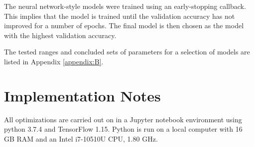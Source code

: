 The neural network-style models were trained using an early-stopping callback. This implies that the model is trained until the validation accuracy has not improved for a number of epochs. The final model is then chosen as the model with the highest validation accuracy. 

The tested ranges and concluded sets of parameters for a selection of models are listed in Appendix \ref{appendix:B}.

\section{Implementation Notes}

All optimizations are carried out on in a Jupyter notebook environment using python 3.7.4 and TensorFlow 1.15. Python is run on a local computer with 16 GB RAM and an Intel i7-10510U CPU, 1.80 GHz. 